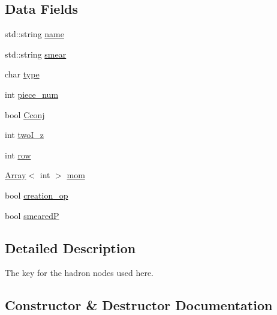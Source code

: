 \subsection*{Data Fields}
\begin{DoxyCompactItemize}
\item 
std\+::string \mbox{\hyperlink{structHadron_1_1HadronVertex__t_af58f39136feeac3eea1c88e51e0e6966}{name}}
\item 
std\+::string \mbox{\hyperlink{structHadron_1_1HadronVertex__t_ac3e4f4944eec3bf5cc7585c4c2cd0b9e}{smear}}
\item 
char \mbox{\hyperlink{structHadron_1_1HadronVertex__t_afc823aabf51c8e23cd8ca57714743f0a}{type}}
\item 
int \mbox{\hyperlink{structHadron_1_1HadronVertex__t_a3e3f1f88d2445152c99d093385caa0dd}{piece\+\_\+num}}
\item 
bool \mbox{\hyperlink{structHadron_1_1HadronVertex__t_a2fe31822eece6cce391ea90a024cdf77}{Cconj}}
\item 
int \mbox{\hyperlink{structHadron_1_1HadronVertex__t_a3edfa542bdf8bd3928a454622bb99157}{two\+I\+\_\+z}}
\item 
int \mbox{\hyperlink{structHadron_1_1HadronVertex__t_a671282dc61af0be721636ec5349b673f}{row}}
\item 
\mbox{\hyperlink{classXMLArray_1_1Array}{Array}}$<$ int $>$ \mbox{\hyperlink{structHadron_1_1HadronVertex__t_a47dd7e7084c5b1f3de51dd036e961cda}{mom}}
\item 
bool \mbox{\hyperlink{structHadron_1_1HadronVertex__t_adb82c1ccc6e02c30a479d04f93de79d3}{creation\+\_\+op}}
\item 
bool \mbox{\hyperlink{structHadron_1_1HadronVertex__t_afe5afbdd6d2da3696ced40fd125afd8d}{smearedP}}
\end{DoxyCompactItemize}


\subsection{Detailed Description}
The key for the hadron nodes used here. 

\subsection{Constructor \& Destructor Documentation}
\mbox{\label{structHadron_1_1HadronVertex__t_ab203b17e0f020c77fc233e70c0466691}} 
